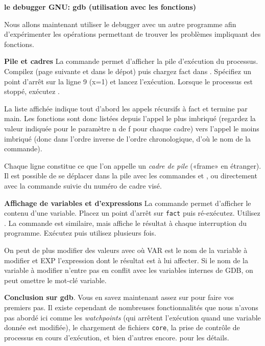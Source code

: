 \documentclass[10pt]{article}\usepackage[nu]{esial}
\begin{document}
\begin{Exercice}\textbf{le debugger GNU: gdb (utilisation avec les fonctions)}

  Nous allons maintenant utiliser le debugger avec un autre programme afin
  d'expérimenter les opérations permettant de trouver les problèmes impliquant
  des fonctions.

  \textbf{Pile et cadres} La commande  permet d'afficher la pile
  d'exécution du processus. Compilez  (page suivante et dans le
  dépot) puis chargez fact dans . Spécifiez un point d'arrêt sur la
  ligne 9 (x=1) et lancez l'exécution. Lorsque le processus est stoppé,
  exécutez .

  La liste affichée indique tout d'abord les appels récursifs à fact et
  termine par main. Les fonctions sont donc listées depuis l'appel le plus
  imbriqué (regardez la valeur indiquée pour le paramètre n de f pour chaque
  cadre) vers l'appel le moins imbriqué (donc dans l'ordre inverse de l'ordre
  chronologique, d'où le nom de la commande).

  Chaque ligne constitue ce que l'on appelle un \textit{cadre de pile} («frame»
  en étranger). Il est possible de se déplacer dans la pile avec les commandes
   et , ou directement avec la commande  suivie du
  numéro de cadre visé.

  \noindent\begin{minipage}{.67\linewidth}
    \medskip \textbf{Affichage de variables et d'expressions} La commande
     permet d'afficher le contenu d'une variable. Placez un point
    d'arrêt sur \texttt{fact} puis ré-exécutez. Utilisez . La
    commande  est similaire, mais affiche le résultat à chaque
    interruption du programme. Exécutez  puis utilisez
     plusieurs fois.
   
    \I On peut de plus modifier des valeurs avec  où
    VAR est le nom de la variable à modifier et EXP l'expression dont le
    résultat est à lui affecter. Si le nom de la variable à modifier n'entre
    pas en conflit avec les variables internes de GDB, on peut omettre le
    mot-clé variable.

  \medskip
  \noindent\textbf{Conclusion sur gdb}. Vous en savez maintenant assez
  sur  pour faire vos premiers pas. Il existe cependant de nombreuses
  fonctionnalités que nous n'avons pas abordé ici comme les
  \textit{watchpoints} (qui arrêtent l'exécution quand une variable donnée est
  modifiée), le chargement de fichiers \texttt{core}, la prise de contrôle de
  processus en cours d'exécution, et bien d'autres encore.  pour
  les détails.
  \end{minipage}\hfill\begin{minipage}{.32\linewidth}
  \end{minipage}


\end{Exercice}
\end{document}
